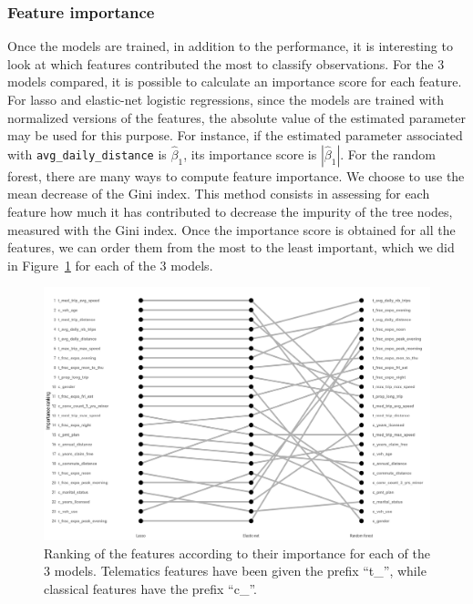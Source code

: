 \documentclass{article}
\begin{document}
\subsubsection{Feature importance}

Once the models are trained, in addition to the performance, it is interesting to look at which features contributed the most to classify observations. For the $3$ models compared, it is possible to calculate an importance score for each feature. For lasso and elastic-net logistic regressions, since the models are trained with normalized versions of the features, the absolute value of the estimated parameter may be used for this purpose. For instance, if the estimated parameter associated with \texttt{avg\_daily\_distance} is $\widehat{\beta}_1$, its importance score is $|\widehat{\beta}_1|$. For the random forest, there are many ways to compute feature importance. We choose to use the mean decrease of the Gini index. This method consists in assessing for each feature how much it has contributed to decrease the impurity of the tree nodes, measured with the Gini index. Once the importance score is obtained for all the features, we can order them from the most to the least important, which we did in Figure~\ref{fig:features_importance_ranking} for each of the $3$ models.
\begin{figure}[ht]
    \centering
    \includegraphics[width=\textwidth]{features_importance_ranking.png}
    \caption{Ranking of the features according to their importance for each of the $3$ models. Telematics features have been given the prefix ``t\_'', while classical features have the prefix ``c\_''.}
    \label{fig:features_importance_ranking}
\end{figure}
\end{document}
